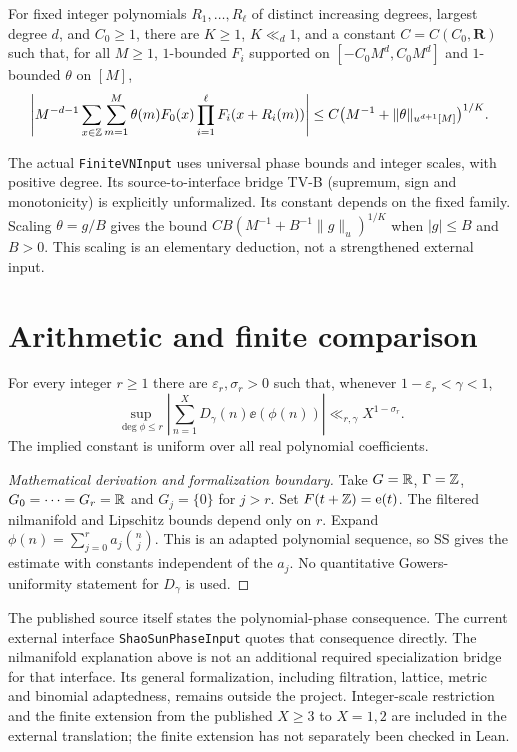 \begin{theorem}\label{t:teravainen}
For fixed integer polynomials $R_1,\ldots,R_\ell$ of distinct increasing degrees, largest degree $d$, and $C_0\geq1$, there are $K\geq1$, $K\ll_d1$, and a constant $C=C(C_0,\mathbf R)$ such that, for all $M\geq1$, $1$-bounded $F_i$ supported on $[-C_0M^d,C_0M^d]$ and $1$-bounded $\theta$ on $[M]$,
\[
 \left|M^{-d-1}\sum_{x\in\mathbb Z}\sum_{m=1}^M
 \theta(m)F_0(x)\prod_{i=1}^{\ell}F_i(x+R_i(m))\right|
 \leq C\bigl(M^{-1}+\|\theta\|_{u^{d+1}[M]}\bigr)^{1/K}.
\]
\end{theorem}
The actual \texttt{FiniteVNInput} uses universal phase bounds and integer scales, with positive degree. Its source-to-interface bridge TV-B (supremum, sign and monotonicity) is explicitly unformalized. Its constant depends on the fixed family. Scaling $\theta=g/B$ gives the bound $CB(M^{-1}+B^{-1}\|g\|_u)^{1/K}$ when $|g|\leq B$ and $B>0$. This scaling is an elementary deduction, not a strengthened external input.

\section{Arithmetic and finite comparison}
\begin{theorem}\label{t:shao-sun}
For every integer $r\geq1$ there are $\varepsilon_r,\sigma_r>0$ such that, whenever $1-\varepsilon_r<\gamma<1$,
\[
 \sup_{\deg\phi\leq r}\left|\sum_{n=1}^{X}D_\gamma(n)\ee(\phi(n))\right|
 \ll_{r,\gamma}X^{1-\sigma_r}.
\]
The implied constant is uniform over all real polynomial coefficients.
\end{theorem}
\begin{proof}[Mathematical derivation and formalization boundary]
Take $G=\mathbb R$, $\Gamma=\mathbb Z$, $G_0=\cdots=G_r=\mathbb R$ and $G_j=\{0\}$ for $j>r$. Set $F(t+\mathbb Z)=\mathrm e(t)$. The filtered nilmanifold and Lipschitz bounds depend only on $r$. Expand $\phi(n)=\sum_{j=0}^{r}a_j\binom nj$. This is an adapted polynomial sequence, so SS gives the estimate with constants independent of the $a_j$. No quantitative Gowers-uniformity statement for $D_\gamma$ is used.
\end{proof}
\ifDetailed
The published source itself states the polynomial-phase consequence. The current external interface \texttt{ShaoSunPhaseInput} quotes that consequence directly. The nilmanifold explanation above is not an additional required specialization bridge for that interface. Its general formalization, including filtration, lattice, metric and binomial adaptedness, remains outside the project. Integer-scale restriction and the finite extension from the published $X\geq3$ to $X=1,2$ are included in the external translation; the finite extension has not separately been checked in Lean.

